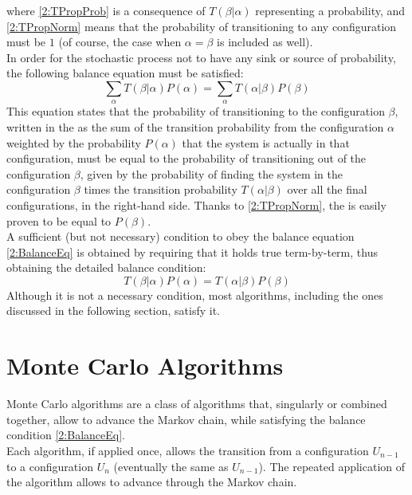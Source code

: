 where \eqref{2:TPropProb} is a consequence of $T(\beta|\alpha)$ representing a probability, and \eqref{2:TPropNorm} means that the probability of transitioning to any configuration must be $1$ (of course, the case when $\alpha=\beta$ is included as well).\\
In order for the stochastic process not to have any sink or source of probability, the following balance equation must be satisfied:
\begin{equation}
    \sum_\alpha T(\beta|\alpha)P(\alpha) = \sum_\alpha T(\alpha|\beta)P(\beta) \label{2:BalanceEq}
\end{equation}
This equation states that the probability of transitioning to the configuration $\beta$, written in the \lhs as the sum of the transition probability from the configuration $\alpha$ weighted by the probability $P(\alpha)$ that the system is actually in that configuration, must be equal to the probability of transitioning out of the configuration $\beta$, given by the probability of finding the system in the configuration $\beta$ times the transition probability $T(\alpha|\beta)$ over all the final configurations, in the right-hand side.
Thanks to \eqref{2:TPropNorm}, the \rhs is easily proven to be equal to $P(\beta)$.\\
A sufficient (but not necessary) condition to obey the balance equation \eqref{2:BalanceEq} is obtained by requiring that it holds true term-by-term, thus obtaining the detailed balance condition:
\begin{equation}
    T(\beta|\alpha)P(\alpha) = T(\alpha|\beta)P(\beta) \label{2:DetailedBalance}
\end{equation}
Although it is not a necessary condition, most algorithms, including the ones discussed in the following section, satisfy it.

\section{Monte Carlo Algorithms}
Monte Carlo algorithms are a class of algorithms that, singularly or combined together, allow to advance the Markov chain, while satisfying the balance condition \eqref{2:BalanceEq}.\\
Each algorithm, if applied once, allows the transition from a configuration $U_{n-1}$ to a configuration $U_n$ (eventually the same as $U_{n-1}$). The repeated application of the algorithm allows to advance through the Markov chain.

